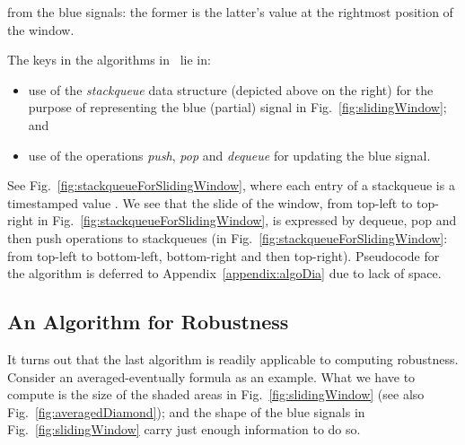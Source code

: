 \documentclass[envcountsect,orivec]{llncs} \usepackage{etex} \usepackage[]{graphicx}
\begin{document}
from the blue signals: 
the former is the latter's value at the
 rightmost position of the window.


The keys in 
the algorithms
in~\cite{DBLP:conf/cav/DonzeFM13,DBLP:journals/njc/Lemire06}
lie in:
\begin{itemize}
 \item use of the \emph{stackqueue} data structure (depicted above on the right) for the
purpose of representing the blue (partial) signal in
Fig.~\ref{fig:slidingWindow}; and 
 \item use of the  operations \emph{push}, \emph{pop} and
       \emph{dequeue} for updating the blue signal.
\end{itemize}
See Fig.~\ref{fig:stackqueueForSlidingWindow}, where each entry of
a stackqueue is a timestamped value . We see that the slide of the window, from top-left to
top-right in Fig.~\ref{fig:stackqueueForSlidingWindow},
is expressed by dequeue, pop and then push operations to stackqueues (in
Fig.~\ref{fig:stackqueueForSlidingWindow}: from top-left to bottom-left,
bottom-right and then top-right).
 Pseudocode for the algorithm is deferred to
Appendix~\ref{appendix:algoDia} due to lack of space.
























































\subsection{An Algorithm for  Robustness}
\label{subsec:algoAvSTL}
It turns out that the last algorithm is readily applicable to 
computing  robustness. Consider an averaged-eventually formula 
 as an example. What we have to compute is
the size of the shaded areas in Fig.~\ref{fig:slidingWindow} (see
also Fig.~\ref{fig:averagedDiamond}); and the shape of the blue 
signals in Fig.~\ref{fig:slidingWindow} carry just enough information
to do so. 
\end{document}
